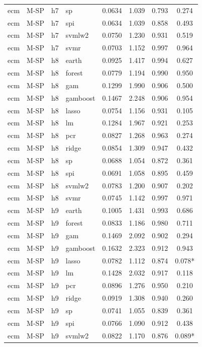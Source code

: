 \begin{ThreePartTable}
\begin{longtable}[t]{llclcccc}
ecm & M-SP & h7 & sp & 0.0634 & 1.039 & 0.793 & 0.274\\
ecm & M-SP & h7 & spi & 0.0634 & 1.039 & 0.858 & 0.493\\
ecm & M-SP & h7 & svmlw2 & 0.0750 & 1.230 & 0.931 & 0.519\\
ecm & M-SP & h7 & svmr & 0.0703 & 1.152 & 0.997 & 0.964\\
\addlinespace
ecm & M-SP & h8 & earth & 0.0925 & 1.417 & 0.994 & 0.627\\
ecm & M-SP & h8 & forest & 0.0779 & 1.194 & 0.990 & 0.950\\
ecm & M-SP & h8 & gam & 0.1299 & 1.990 & 0.906 & 0.500\\
ecm & M-SP & h8 & gamboost & 0.1467 & 2.248 & 0.906 & 0.954\\
ecm & M-SP & h8 & lasso & 0.0754 & 1.156 & 0.931 & 0.105\\
ecm & M-SP & h8 & lm & 0.1284 & 1.967 & 0.921 & 0.253\\
ecm & M-SP & h8 & pcr & 0.0827 & 1.268 & 0.963 & 0.274\\
ecm & M-SP & h8 & ridge & 0.0854 & 1.309 & 0.947 & 0.432\\
ecm & M-SP & h8 & sp & 0.0688 & 1.054 & 0.872 & 0.361\\
ecm & M-SP & h8 & spi & 0.0691 & 1.058 & 0.895 & 0.459\\
ecm & M-SP & h8 & svmlw2 & 0.0783 & 1.200 & 0.907 & 0.202\\
ecm & M-SP & h8 & svmr & 0.0745 & 1.142 & 0.997 & 0.971\\
\addlinespace
ecm & M-SP & h9 & earth & 0.1005 & 1.431 & 0.993 & 0.686\\
ecm & M-SP & h9 & forest & 0.0833 & 1.186 & 0.980 & 0.711\\
ecm & M-SP & h9 & gam & 0.1469 & 2.092 & 0.902 & 0.294\\
ecm & M-SP & h9 & gamboost & 0.1632 & 2.323 & 0.912 & 0.943\\
ecm & M-SP & h9 & lasso & 0.0782 & 1.112 & 0.874 & 0.078*\\
ecm & M-SP & h9 & lm & 0.1428 & 2.032 & 0.917 & 0.118\\
ecm & M-SP & h9 & pcr & 0.0896 & 1.276 & 0.950 & 0.210\\
ecm & M-SP & h9 & ridge & 0.0919 & 1.308 & 0.940 & 0.260\\
ecm & M-SP & h9 & sp & 0.0741 & 1.055 & 0.839 & 0.361\\
ecm & M-SP & h9 & spi & 0.0766 & 1.090 & 0.912 & 0.438\\
ecm & M-SP & h9 & svmlw2 & 0.0822 & 1.170 & 0.876 & 0.089*\\

\end{longtable}
\end{ThreePartTable}
